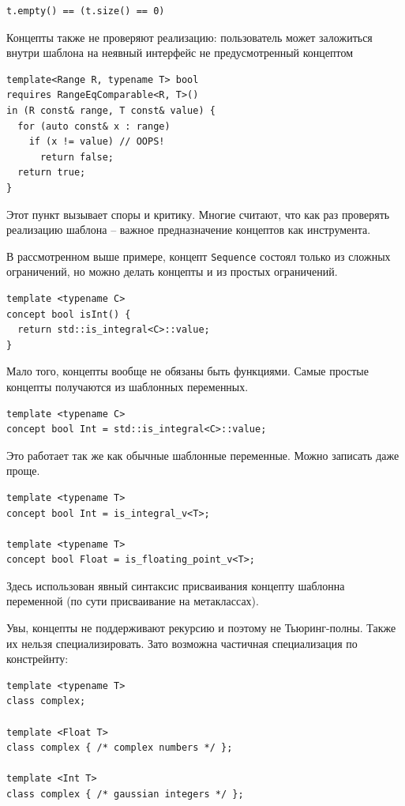 \documentclass[a4paper,12pt,oneside]{article}
\begin{document}
\begin{lstlisting}
t.empty() == (t.size() == 0)
\end{lstlisting}

Концепты также не проверяют реализацию: пользователь может заложиться внутри шаблона на неявный интерфейс не предусмотренный концептом

\begin{lstlisting}
template<Range R, typename T> bool
requires RangeEqComparable<R, T>()
in (R const& range, T const& value) {
  for (auto const& x : range)
    if (x != value) // OOPS!
      return false;
  return true;
}
\end{lstlisting}

Этот пункт вызывает споры и критику. Многие считают, что как раз проверять реализацию шаблона -- важное предназначение концептов как инструмента.

В рассмотренном выше примере, концепт \lstinline!Sequence! состоял только из сложных ограничений, но можно делать концепты и из простых ограничений.

\begin{lstlisting}
template <typename C> 
concept bool isInt() { 
  return std::is_integral<C>::value;
}
\end{lstlisting}

Мало того, концепты вообще не обязаны быть функциями. Самые простые концепты получаются из шаблонных переменных.

\begin{lstlisting}
template <typename C> 
concept bool Int = std::is_integral<C>::value;
\end{lstlisting}

Это работает так же как обычные шаблонные переменные. Можно записать даже проще.

\begin{lstlisting}
template <typename T>
concept bool Int = is_integral_v<T>;

template <typename T>
concept bool Float = is_floating_point_v<T>;
\end{lstlisting}

Здесь использован явный синтаксис присваивания концепту шаблонна переменной (по сути присваивание на метаклассах).

Увы, концепты не поддерживают рекурсию и поэтому не Тьюринг-полны. Также их нельзя специализировать. Зато возможна частичная специализация по констрейнту:

\begin{lstlisting}
template <typename T>
class complex;

template <Float T>
class complex { /* complex numbers */ };

template <Int T>
class complex { /* gaussian integers */ };
\end{lstlisting}
\end{document}
